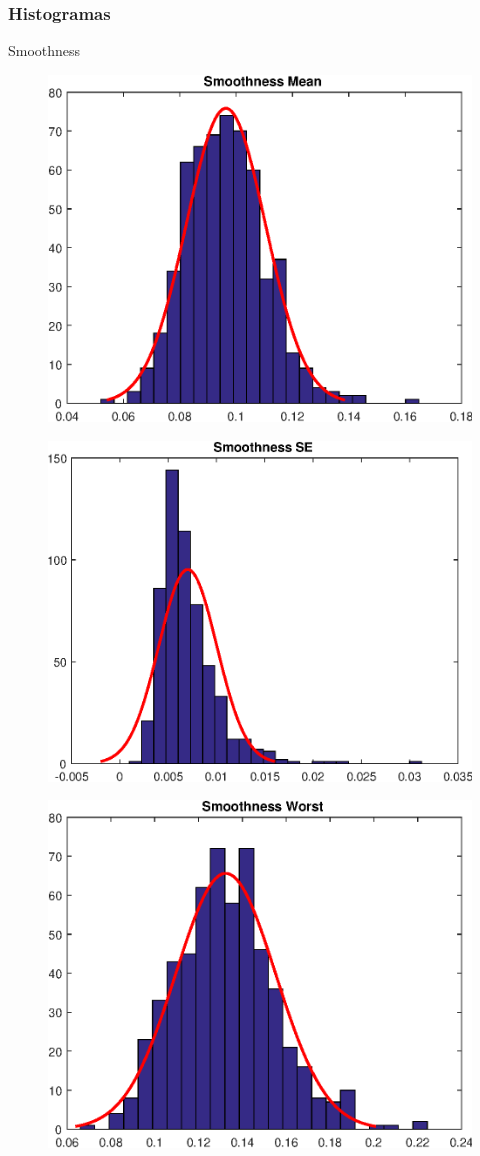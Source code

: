 \documentclass{beamer}
\begin{document}
\begin{frame}

\frametitle{Histogramas}
Smoothness
\begin{figure}[H]
\centering
  \includegraphics[width=.3\linewidth]{./img/smoothness_mean}
  \label{fig:test1}
\end{figure}%

\begin{figure}[H]
\centering
\begin{minipage}{.3\textwidth}
  \centering
  \includegraphics[width=\linewidth]{./img/smoothness_se}
  \label{fig:test1}
\end{minipage}%
\begin{minipage}{.3\textwidth}
  \centering
  \includegraphics[width=\linewidth]{./img/smoothness_worst}

\end{minipage}
\end{figure}
\end{frame}
\end{document}
